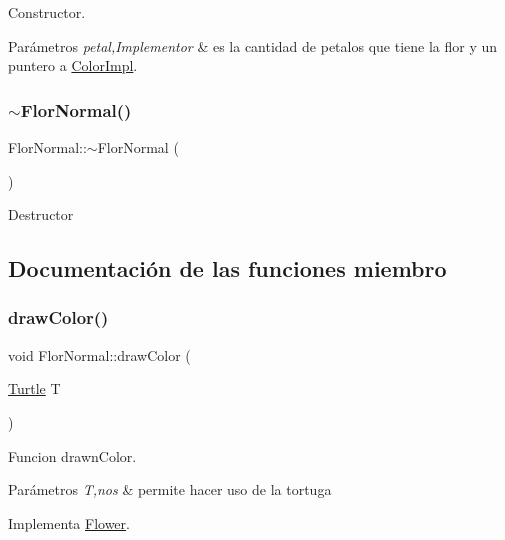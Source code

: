 Constructor. 
\begin{DoxyParams}{Parámetros}
{\em petal,Implementor} & es la cantidad de petalos que tiene la flor y un puntero a \hyperlink{classColorImpl}{Color\+Impl}. \\
\hline
\end{DoxyParams}
\mbox{\label{classFlorNormal_a96ed2aba6c2f54bd4312330ad1d56d42}} 
\subsubsection{\texorpdfstring{$\sim$\+Flor\+Normal()}{~FlorNormal()}}
{\footnotesize\ttfamily Flor\+Normal\+::$\sim$\+Flor\+Normal (\begin{DoxyParamCaption}{ }\end{DoxyParamCaption})}

Destructor 

\subsection{Documentación de las funciones miembro}
\mbox{\label{classFlorNormal_a0ae303fc4e8528a3bd8f69e62a8b32c4}} 
\subsubsection{\texorpdfstring{draw\+Color()}{drawColor()}}
{\footnotesize\ttfamily void Flor\+Normal\+::draw\+Color (\begin{DoxyParamCaption}\item[{\hyperlink{classTurtle}{Turtle}}]{T }\end{DoxyParamCaption})\hspace{0.3cm}{\ttfamily [virtual]}}

Funcion drawn\+Color. 
\begin{DoxyParams}{Parámetros}
{\em T,nos} & permite hacer uso de la tortuga \\
\hline
\end{DoxyParams}


Implementa \hyperlink{classFlower_a23dd402c7227bf81c42d7e57772c15bf}{Flower}.

